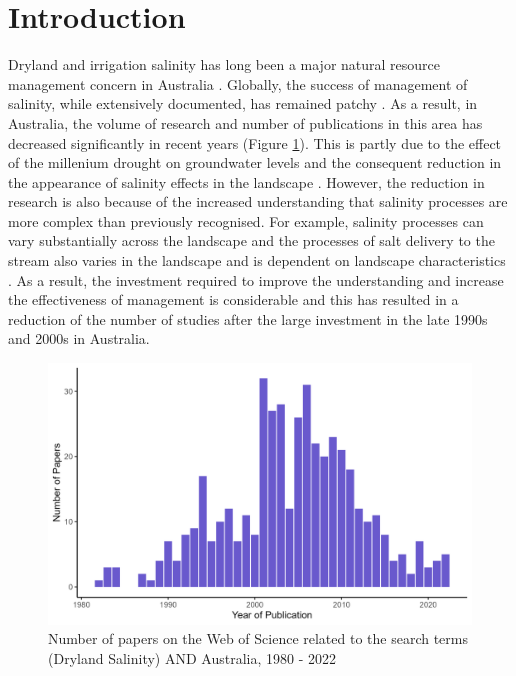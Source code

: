 \documentclass[, manuscript]{copernicus}
\begin{document}
\section{Introduction}

Dryland and irrigation salinity has long been a major natural resource
management concern in Australia
\citep{Jolly2001, White2009, Scanlon2007, Walker2002, Finlayson2010}.
Globally, the success of management of salinity, while extensively
documented, has remained patchy \citep{Leblanc2012}. As a result, in
Australia, the volume of research and number of publications in this
area has decreased significantly in recent years (Figure
\ref{fig:SalinityPapers}). This is partly due to the effect of the
millenium drought on groundwater levels and the consequent reduction in
the appearance of salinity effects in the landscape
\citep{Mcfarlane2016}. However, the reduction in research is also
because of the increased understanding that salinity processes are more
complex than previously recognised. For example, salinity processes can
vary substantially across the landscape \citep{Conyers2008} and the
processes of salt delivery to the stream also varies in the landscape
\citep{Summerell2006, Hughes2007} and is dependent on landscape
characteristics \citep{vanDijk2008, Dalhaus2010}. As a result, the
investment required to improve the understanding and increase the
effectiveness of management is considerable and this has resulted in a
reduction of the number of studies after the large investment in the
late 1990s and 2000s in Australia.

\begin{figure}
\includegraphics[width=0.9\linewidth]{Figures/Dryland Salinity Papers} \caption{Number of papers on the Web of Science related to the search terms (Dryland Salinity) AND Australia, 1980 - 2022}\label{fig:SalinityPapers}
\end{figure}
\end{document}
